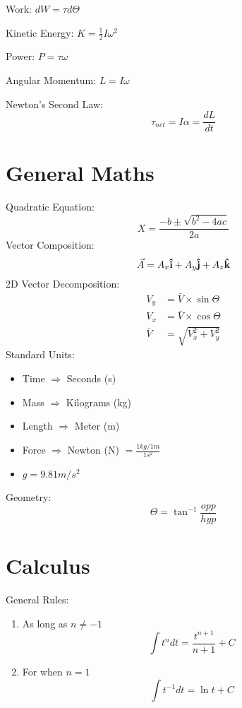 \documentclass[8pt, twocolumn]{article}
\begin{document}
	Work: $dW = \tau d \Theta$

	Kinetic Energy: $K = \frac{1}{2} I \omega^2$

	Power: $P = \tau \omega$

	Angular Momentum: $L = I\omega$

	Newton's Second Law:
	\[\tau_{net} = I\alpha = \frac{dL}{dt}\]

\section{General Maths}
	Quadratic Equation: 
	\[
		X = \frac{-b \pm \sqrt{b^2 - 4ac}}{2a}
	\]
	Vector Composition:
	\[
		\vec{A} = A_x \mathbf{\hat{i}} + A_y \mathbf{\hat{j}} + A_z \mathbf{\hat{k}}
	\]
	2D Vector Decomposition:
	\[
		\begin{aligned}
			V_y &= \bar{V} \times \sin{\Theta} \\
			V_x &= \bar{V} \times \cos{\Theta} \\
			\bar{V} &= \sqrt{V_x^2 + V_y^2}
		\end{aligned}
	\]
	Standard Units:
	\begin{itemize}
		\item Time $\Rightarrow $ Seconds (s)
		\item Mass $\Rightarrow $ Kilograms (kg)
		\item Length $\Rightarrow $ Meter (m)
		\item Force $\Rightarrow $ Newton (N) $ = \frac{1 kg / 1 m}{1 s^2} $
		\item $ g = 9.81 m/s^2 $
	\end{itemize}
	Geometry:
	\[
		\Theta = \tan^{-1}{\frac{opp}{hyp}}
	\]

\section{Calculus}
	General Rules:
	\begin{enumerate}
		\item As long as $ n \neq -1 $
			\[
				\int t^n dt = \frac{t^{n+1}}{n+1} + C
			\]
		\item For when $ n = 1 $
			\[
				\int t^{-1} dt = \ln{t} + C
			\]
	\end{enumerate}
\end{document}
